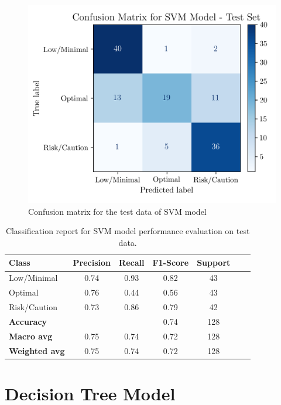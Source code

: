 \documentclass[conference]{IEEEtran}
\begin{document}
\begin{figure}[H]
    \centering
    \includegraphics[width=1\linewidth]{assets/SVM_ConfusionMatrixTest.png}
    \caption{Confusion matrix for the test data of SVM model}
    \label{svm_cm_test}
\end{figure} %

\begin{table}[H]
\centering
\caption{Classification report for SVM model performance evaluation on test data.}
\label{crTestSVM}
\begin{tabular}{lcccccc}
\toprule
\textbf{Class} & \textbf{Precision} & \textbf{Recall} & \textbf{F1-Score} & \textbf{Support} \\
\midrule
Low/Minimal & 0.74 & 0.93 & 0.82 & 43 \\
Optimal & 0.76 & 0.44 & 0.56 & 43 \\
Risk/Caution & 0.73 & 0.86 & 0.79 & 42 \\
\midrule
\textbf{Accuracy} &  &  & 0.74 & 128 \\
\textbf{Macro avg} & 0.75 & 0.74 & 0.72 & 128 \\
\textbf{Weighted avg} & 0.75 & 0.74 & 0.72 & 128 \\
\bottomrule
\end{tabular}
\end{table} %

\section{Decision Tree Model}
\end{document}
